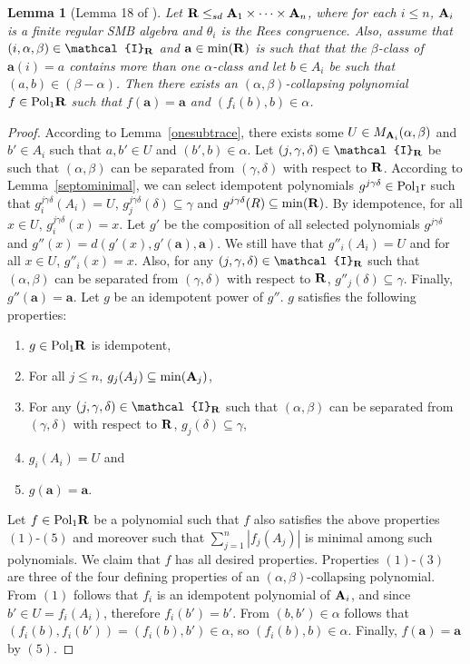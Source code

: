 \documentclass[11pt]{amsart}
\newcommand{\m}[1]{{\uppercase {\mathbf {#1}}}}
\newcommand{\vr}[1]{{\uppercase {\mathcal{#1}}}}
\newcommand{\poln}[2]{{\rm Pol_{#1}\m #2}}
\newtheorem{lm}[thm]{Lemma}
\theoremstyle{definition}
\begin{document}
\begin{lm}[Lemma 18 of \cite{BuSMB}]\label{collapsingexist}
Let $\m R\leq_{sd}\m a_1\times\dots\times\m a_n$, where for each $i\leq n$, $\m a_i$ is a finite regular SMB algebra and $\theta_i$ is the Rees congruence. Also, assume that $(i,\alpha,\beta)\in \vr i_{\m R}$ and $\mathbf{a}\in\mathrm{min}(\m r)$ is such that that the $\beta$-class of $\mathbf{a}(i)=a$ contains more than one $\alpha$-class and let $b\in A_i$ be such that $(a,b)\in(\beta-\alpha)$. Then there exists an $(\alpha,\beta)$-collapsing polynomial $f\in\poln{1}{r}$ such that $f(\mathbf{a})=\mathbf{a}$ and $(f_i(b),b)\in \alpha$.
\end{lm}

\begin{proof}
According to Lemma~\ref{onesubtrace}, there exists some $U\in M_{\m a_i}(\alpha,\beta)$ and $b'\in A_i$ such that $a,b'\in U$ and $(b',b)\in\alpha$. Let $(j,\gamma,\delta)\in\vr i_{\m r}$ be such that $(\alpha,\beta)$ can be separated from $(\gamma,\delta)$ with respect to $\m r$. According to Lemma~\ref{septominimal}, we can select idempotent polynomials $g^{j\gamma \delta}\in\poln{1}{\m r}$ such that $g^{j\gamma \delta}_i(A_i)=U$,  $g^{j\gamma \delta}_j(\delta)\subseteq\gamma$ and $g^{j\gamma \delta}(R)\subseteq\mathrm{min}(\m r)$. By idempotence, for all $x\in U$, $g^{j\gamma \delta}_i(x)=x$. Let $g'$ be the composition of all selected polynomials $g^{j\gamma \delta}$ and $g''(x)=d(g'(x),g'(\mathbf{a}),\mathbf{a})$. We still have that $g''_i(A_i)=U$ and for all $x\in U$, $g''_i(x)=x$. Also, for any $(j,\gamma,\delta)\in\vr i_{\m r}$ such that $(\alpha,\beta)$ can be separated from $(\gamma,\delta)$ with respect to $\m r$, $g''_j(\delta)\subseteq \gamma$. Finally, $g''(\mathbf{a})=\mathbf{a}$. Let $g$ be an idempotent power of $g''$. $g$ satisfies the following properties:
\begin{enumerate}
\item $g\in\poln{1}{r}$ is idempotent,
\item For all $j\leq n$, $g_j(A_j)\subseteq \mathrm{min}(\m a_j)$,
\item For any $(j,\gamma,\delta)\in\vr i_{\m r}$ such that $(\alpha,\beta)$ can be separated from $(\gamma,\delta)$ with respect to $\m r$, $g_j(\delta)\subseteq \gamma$,
\item $g_i(A_i)=U$ and
\item $g(\mathbf{a})=\mathbf{a}$.
\end{enumerate}
Let $f\in\poln{1}{r}$ be a polynomial such that $f$ also satisfies the above properties $(1)$-$(5)$ and moreover such that $\sum\limits_{j=1}^n|f_j(A_j)|$ is minimal among such polynomials. We claim that $f$ has all desired properties. Properties $(1)$-$(3)$ are three of the four defining properties of an $(\alpha,\beta)$-collapsing polynomial. From $(1)$ follows that $f_i$ is an idempotent polynomial of $\m a_i$, and since $b'\in U=f_i(A_i)$, therefore $f_i(b')=b'$. From $(b,b')\in\alpha$ follows that $(f_i(b),f_i(b'))=(f_i(b),b')\in\alpha$, so $(f_i(b),b)\in\alpha$. Finally, $f(\mathbf{a})=\mathbf{a}$ by $(5)$.


\end{proof}
\end{document}
